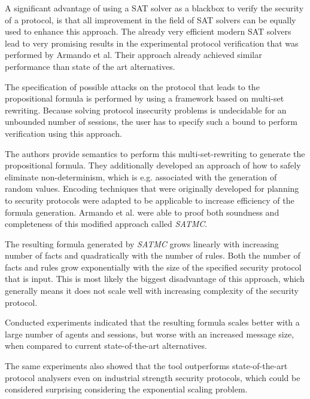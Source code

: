 \documentclass[a4paper,UKenglish]{lipics-v2018}
\begin{document}
A significant advantage of using a SAT solver as a blackbox to verify the security of a protocol, is that all improvement in the field of SAT solvers can be equally used to enhance this approach. The already very efficient modern SAT solvers lead to very promising results in the experimental protocol verification that was performed by Armando et al. Their approach already achieved similar performance than state of the art alternatives.
\cite{sat}

The specification of possible attacks on the protocol that leads to the propositional formula is performed by using a framework based on multi-set rewriting. Because solving protocol insecurity problems is undecidable for an unbounded number of sessions, the user has to specify such a bound to perform verification using this approach.
\cite{sat}


The authors provide semantics to perform this multi-set-rewriting to generate the propositional formula. They additionally developed an approach of how to safely eliminate non-determinism, which is e.g. associated with the generation of random values.
Encoding techniques that were originally developed for planning to security protocols were adapted to be applicable to increase efficiency of the formula generation. Armando et al. were able to proof both soundness and completeness of this modified approach called \textit{SATMC}.
\cite{sat}

The resulting formula generated by \textit{SATMC} grows linearly with increasing number of facts and quadratically with the number of rules. Both the number of facts and rules grow exponentially with the size of the specified security protocol that is input. This is most likely the biggest disadvantage of this approach, which generally means it does not scale well with increasing complexity of the security protocol.
\cite{sat}

Conducted experiments indicated that the resulting formula scales better with a large number of agents and sessions, but worse with an increased message size, when compared to current state-of-the-art alternatives.
\cite{sat}


The same experiments also showed that the tool outperforms state-of-the-art protocol analysers even on industrial strength security protocols, which could be considered surprising considering the exponential scaling problem.
\cite{sat}
\end{document}
